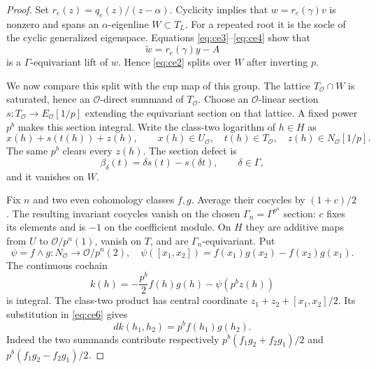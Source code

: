\documentclass[11pt]{article}
\theoremstyle{definition}
\numberwithin{equation}{section}
\begin{document}
\begin{proof}
Set $r_e(z)=q_e(z)/(z-\alpha)$. Cyclicity implies that
$w=r_e(\gamma)v$ is nonzero and spans an $\alpha$-eigenline
$W\subset T_L$. For a repeated root it is the socle of the cyclic
generalized eigenspace. Equations \eqref{eq:ce3}--\eqref{eq:ce4} show that
\begin{equation}
 \widetilde w=r_e(\gamma)y-A
\end{equation}
is a $\Gamma$-equivariant lift of $w$. Hence \eqref{eq:ce2} splits over
$W$ after inverting $p$.

We now compare this split with the cup map of this group. The lattice
$T_{\mathcal O}\cap W$ is saturated, hence an $\mathcal O$-direct
summand of $T_{\mathcal O}$. Choose an $\mathcal O$-linear section
$s:T_{\mathcal O}\to E_{\mathcal O}[1/p]$ extending the equivariant
section on that lattice. A fixed power $p^b$ makes this section
integral. Write the class-two logarithm of $h\in H$ as
\begin{equation}
 x(h)+s(t(h))+z(h),\qquad
 x(h)\in U_{\mathcal O},\quad t(h)\in T_{\mathcal O},\quad
 z(h)\in N_{\mathcal O}[1/p].
\end{equation}
The same $p^b$ clears every $z(h)$. The section defect is
\begin{equation}
 \beta_\delta(t)=\delta s(t)-s(\delta t),\qquad\delta\in\Gamma,
                                                               \label{eq:ce5}
\end{equation}
and it vanishes on $W$.

Fix $n$ and two even cohomology classes $f,g$. Average their cocycles
by $(1+c)/2$. The resulting invariant cocycles vanish on the chosen
$\Gamma_n=\Gamma^{p^n}$ section: $c$ fixes its elements and is
$-1$ on the coefficient module. On $H$ they are additive maps
from $U$ to $\mathcal O/p^n(1)$, vanish on $T$, and are
$\Gamma_n$-equivariant. Put
\begin{equation}
 \psi=f\wedge g:N_{\mathcal O}\longrightarrow\mathcal O/p^n(2),
 \quad
 \psi([x_1,x_2])=f(x_1)g(x_2)-f(x_2)g(x_1).
\end{equation}
The continuous cochain
\begin{equation}
 k(h)=-\frac{p^b}{2}f(h)g(h)-\psi(p^b z(h))                    \label{eq:ce6}
\end{equation}
is integral. The class-two product has central coordinate
$z_1+z_2+[x_1,x_2]/2$. Its substitution in \eqref{eq:ce6} gives
\begin{equation}
 dk(h_1,h_2)=p^b f(h_1)g(h_2).
\end{equation}
Indeed the two summands contribute respectively
$p^b(f_1g_2+f_2g_1)/2$ and $p^b(f_1g_2-f_2g_1)/2$.


\end{proof}
\end{document}
